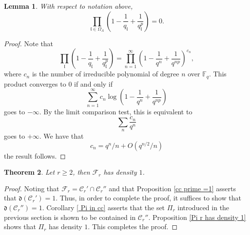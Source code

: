 \documentclass[11pt]{amsart}
\newtheorem{theorem}{Theorem}[section]
\newtheorem{lemma}[theorem]{Lemma}
\newcommand{\cF}{\mathcal{F}}
\newcommand{\fl}{\mathfrak{l}}
\newcommand{\F}{\mathbb{F}}
\newcommand{\cC}{\mathcal{C}}
\newcommand{\op}[1]{\operatorname{#1}}
\numberwithin{equation}{section}
\begin{document}
\begin{lemma}\label{last lemma}
    With respect to notation above, 
    \[\prod_{\fl\in \Omega_A}\left(1-\frac{1}{q_{\fl}}+\frac{1}{q_{\fl}^p}\right)=0. \]
\end{lemma}
\begin{proof}
    Note that \[\prod_{\fl}\left(1-\frac{1}{q_{\fl}}+\frac{1}{q_{\fl}^p}\right)=\prod_{n=1}^\infty \left(1-\frac{1}{q^n}+\frac{1}{q^{np}}\right)^{c_n},\] where $c_n$ is the number of irreducible polynomial of degree $n$ over $\F_q$. This product converges to $0$ if and only if 
    \[\sum_{n=1}^\infty c_n\op{log} \left(1-\frac{1}{q^n}+\frac{1}{q^{np}}\right)\] goes to $-\infty$. By the limit comparison test, this is equivalent to 
    \[\sum_n \frac{c_n}{q^n} \] goes to $+\infty$. We have that 
    \[c_n=q^n/n +O(q^{n/2}/n)\]
    \cite[Theorem 2.2]{Rosen} the result follows.
\end{proof}

\begin{theorem}\label{main thm end}
    Let $r\geq 2$, then $\cF_r$ has density $1$.
\end{theorem}
\begin{proof}
    Noting that $\cF_r=\cC_r'\cap \cC_r''$ and that Proposition \ref{cc prime =1} asserts that $\mathfrak{d}(\cC_r')=1$. Thus, in order to complete the proof, it suffices to show that $\mathfrak{d}(\cC_r'')=1$. Corollary \ref{ Pi in cc} asserts that the set $\Pi_r$ introduced in the previous section is shown to be contained in $\cC_r''$. Proposition \ref{Pi r has density 1} shows that $\Pi_r$ has density $1$. This completes the proof.
\end{proof}


\end{document}

